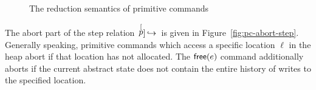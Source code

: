 \documentclass[11pt]{report}
\begin{document}
\begin{figure}[h]
	\centering
	
	
	\vspace{1em}
	

	\vspace{1em}
	

	\vspace{1em}
	
	
	\vspace{1em}
	

	\vspace{1em}
	
	
	\vspace{1em}
	

	\caption{The reduction semantics of primitive commands}
	\label{fig:pc-red-step}
\end{figure}

The abort part of the step relation $\,\stackrel[p]{}{\,\hookrightarrow}\,$ is given in Figure~\ref{fig:pc-abort-step}. Generally speaking, primitive commands which access a specific location $\ell$ in the heap abort if that location has not allocated. The $\operatorname{\mathsf{free}}(e)$ command additionally aborts if the current abstract state does not contain the entire history of writes to the specified location. 
\end{document}
